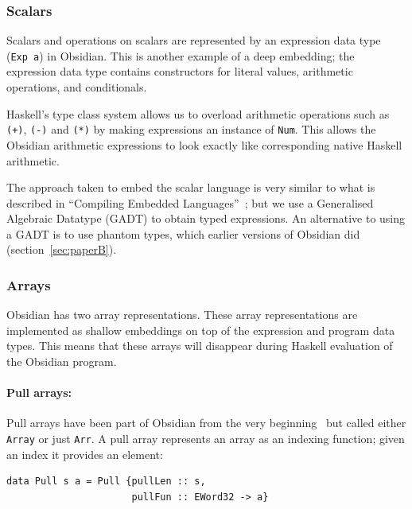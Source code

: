 \documentclass[a4paper]{book}
\begin{document}
\subsubsection{Scalars} 

Scalars and operations on scalars are represented by an expression data type \\ ({\tt Exp a}) in 
Obsidian. This is another example of a deep embedding; the expression data type contains 
constructors for literal values, arithmetic operations, and conditionals. 

Haskell's type class system allows us to overload arithmetic operations such as {\tt (+)}, 
{\tt (-)} and {\tt (*)} by making expressions an instance of {\tt Num}. This allows the 
Obsidian arithmetic expressions to look exactly like corresponding native Haskell arithmetic. 

The approach taken to embed the scalar language is very similar to what is described 
in ``Compiling Embedded Languages''~\citet{COMPILEEDSL}; but we use a Generalised Algebraic 
Datatype (GADT) to obtain typed expressions. An alternative to using a GADT is to use phantom 
types, which earlier versions of Obsidian did (section~\ref{sec:paperB}).   


\subsubsection{Arrays} 
\label{sec:OBSARRAYS}

Obsidian has two array representations. These array representations are implemented as 
shallow embeddings on top of the expression and program data types. This means that these 
arrays will disappear during Haskell evaluation of the Obsidian program.
 
\paragraph{Pull arrays:}

Pull arrays have been part of Obsidian from the very beginning~\citet{JMT} but called either 
{\tt Array} or just {\tt Arr}. A pull array represents an array as an indexing function; given 
an index it provides an element: 

\begin{verbatim} 
data Pull s a = Pull {pullLen :: s, 
                      pullFun :: EWord32 -> a}
\end{verbatim} 
\end{document}
